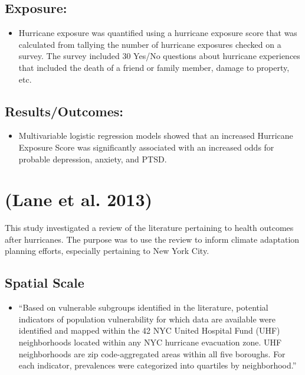 \documentclass[
]{article}
\providecommand{\tightlist}{%
  \setlength{\itemsep}{0pt}\setlength{\parskip}{0pt}}
\begin{document}
\hypertarget{exposure-7}{%
\subsection{Exposure:}\label{exposure-7}}

\begin{itemize}
\tightlist
\item
  Hurricane exposure was quantified using a hurricane exposure score
  that was calculated from tallying the number of hurricane exposures
  checked on a survey. The survey included 30 Yes/No questions about
  hurricane experiences that included the death of a friend or family
  member, damage to property, etc.
\end{itemize}

\hypertarget{resultsoutcomes-7}{%
\subsection{Results/Outcomes:}\label{resultsoutcomes-7}}

\begin{itemize}
\tightlist
\item
  Multivariable logistic regression models showed that an increased
  Hurricane Exposure Score was significantly associated with an
  increased odds for probable depression, anxiety, and PTSD.
\end{itemize}

\hypertarget{lane2013health}{%
\section{(Lane et al. 2013)}\label{lane2013health}}

This study investigated a review of the literature pertaining to health
outcomes after hurricanes. The purpose was to use the review to inform
climate adaptation planning efforts, especially pertaining to New York
City.

\hypertarget{spatial-scale-9}{%
\subsection{Spatial Scale}\label{spatial-scale-9}}

\begin{itemize}
\tightlist
\item
  ``Based on vulnerable subgroups identified in the literature,
  potential indicators of population vulnerability for which data are
  available were identified and mapped within the 42 NYC United Hospital
  Fund (UHF) neighborhoods located within any NYC hurricane evacuation
  zone. UHF neighborhoods are zip code-aggregated areas within all five
  boroughs. For each indicator, prevalences were categorized into
  quartiles by neighborhood.''
\end{itemize}
\end{document}
